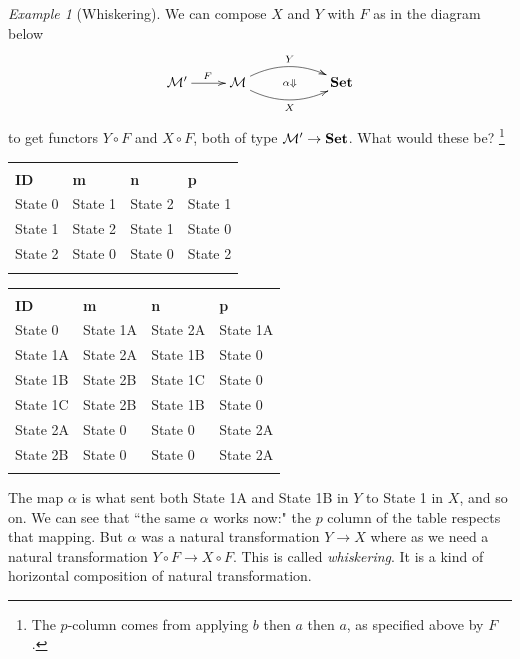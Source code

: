 \documentclass{book}
\def\mc{\mathcal}
\def\to{\rightarrow}
\def\Down{\Downarrow}
\def\Set{{\bf Set}}
\def\bhline{\Xhline{2\arrayrulewidth}}
\def\bbhline{\Xhline{2.5\arrayrulewidth}}
\def\mcM{\mc{M}}
\theoremstyle{remark}
\newtheorem{example}[subsubsection]{Example}
\theoremstyle{definition}
\begin{document}
\begin{example}[Whiskering]
We can compose $X$ and $Y$ with $F$ as in the diagram below
$$
\xymatrix{\mcM'\ar[r]^F&\mcM\ar@/^1pc/[rr]^Y\ar@/_1pc/[rr]_X\ar@{}[rr]|{\alpha\Down}&&\Set}
$$
to get functors $Y\circ F$ and $X\circ F$, both of type $\mcM'\to\Set$. What would these be?
\footnote{The $p$-column comes from applying $b$ then $a$ then $a$, as specified above by $F$.}
\begin{center}\footnotesize
\begin{tabular}{| l || l | l | l |}\bhline
\multicolumn{4}{|c|}{$X\circ F$}\\\bhline
{\bf ID}&{\bf m}&{\bf n}&{\bf p}\\\bbhline
State 0&State 1&State 2&State 1\\\hline
State 1& State 2& State 1&State 0\\\hline
State 2&State 0&State 0&State 2\\\bhline
\end{tabular}
\hspace{.5in}
\begin{tabular}{| l || l | l | l |}\bhline
\multicolumn{4}{|c|}{$Y\circ F$}\\\bhline
{\bf ID}&{\bf m}&{\bf n}&{\bf p}\\\bbhline
State 0&State 1A&State 2A&State 1A\\\hline
State 1A& State 2A& State 1B&State 0\\\hline
State 1B& State 2B& State 1C&State 0\\\hline
State 1C&State 2B&State 1B&State 0\\\hline
State 2A&State 0&State 0&State 2A\\\hline
State 2B&State 0&State 0&State 2A\\\bhline
\end{tabular}
\end{center}

The map $\alpha$ is what sent both State 1A and State 1B in $Y$ to State 1 in $X$, and so on. We can see that ``the same $\alpha$ works now:" the $p$ column of the table respects that mapping. But $\alpha$ was a natural transformation $Y\to X$ where as we need a natural transformation $Y\circ F\to X\circ F$. This is called {\em whiskering}. It is a kind of horizontal composition of natural transformation.

\end{example}
\end{document}
